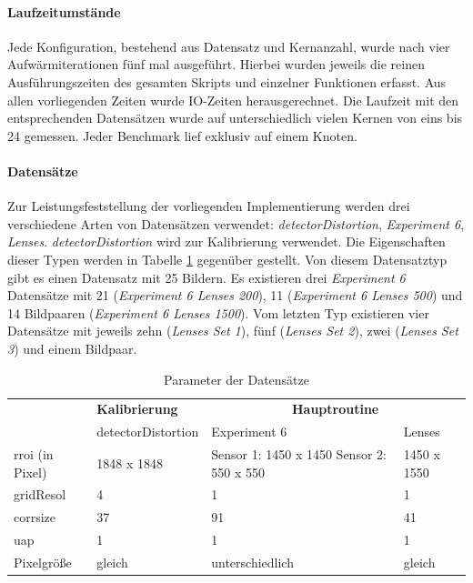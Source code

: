 \paragraph{Laufzeitumstände}

Jede Konfiguration, bestehend aus Datensatz und Kernanzahl, wurde nach vier Aufwärmiterationen fünf mal ausgeführt. Hierbei wurden jeweils die reinen Ausführungszeiten des gesamten Skripts und einzelner Funktionen erfasst. Aus allen vorliegenden Zeiten wurde \gls{IO}-Zeiten herausgerechnet. Die Laufzeit mit den entsprechenden Datensätzen wurde auf unterschiedlich vielen Kernen von eins bis 24 gemessen. Jeder Benchmark lief exklusiv auf einem Knoten.  

\paragraph{Datensätze}

Zur Leistungsfeststellung der vorliegenden Implementierung werden drei verschiedene Arten von Datensätzen verwendet: \textit{detectorDistortion}, \textit{Experiment 6}, \textit{Lenses}. \textit{detectorDistortion} wird zur Kalibrierung verwendet. Die Eigenschaften dieser Typen werden in Tabelle \ref{tab:datasets} gegenüber gestellt.  Von diesem Datensatztyp gibt es einen Datensatz mit 25 Bildern. Es existieren drei \textit{Experiment 6} Datensätze mit 21 (\textit{Experiment 6 Lenses 200}), 11 (\textit{Experiment 6 Lenses 500}) und 14 Bildpaaren (\textit{Experiment 6 Lenses 1500}). Vom letzten Typ existieren vier Datensätze mit jeweils zehn (\textit{Lenses Set 1}), fünf (\textit{Lenses Set 2}), zwei (\textit{Lenses Set 3}) und einem Bildpaar.

\begin{table}
	\begin{tabularx}{\textwidth}{| X || X || X | X |}
		\hline
		& \textbf{Kalibrierung} & \multicolumn{2}{c|}{\textbf{Hauptroutine}} \\
		\cline{2-4}
		& detectorDistortion & Experiment 6 & Lenses \\
		\hline
		\hline
		\gls{rroi} (in Pixel) & 1848 x 1848 & Sensor 1: 1450 x 1450 \newline
		Sensor 2: 550 x 550 & 1450 x 1550 \\
		\hline
		\gls{gridResol} & 4 & 1 & 1 \\
		\hline
		\gls{corrsize} & 37 & 91 & 41 \\
		\hline
		\gls{uap} & 1 & 1 & 1 \\
		\hline
		Pixelgröße & gleich & unterschiedlich & gleich \\
		\hline
	\end{tabularx}
	\caption{Parameter der Datensätze}
	\label{tab:datasets}
\end{table}

